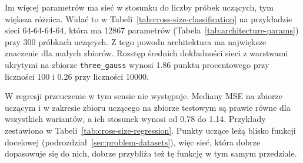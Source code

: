 Im więcej parametrów ma sieć w stosunku do liczby próbek uczących, tym większa różnica. Widać to w Tabeli~\ref{tab:cross-size-classification} na przykładzie sieci 64-64-64-64, która ma \num{12867} parametrów (Tabela~\ref{tab:architecture-params}) przy $300$ próbkach uczących. Z tego powodu architektura ma największe znaczenie dla małych zbiorów. Rozstęp średnich dokładności sieci z warstwami ukrytymi na zbiorze \texttt{three\_gauss} wynosi \num{1.86} punktu procentowego przy liczności \num{100} i \num{0.26} przy liczności \num{10000}.

W regresji przeuczenie w tym sensie nie występuje. Mediany MSE na zbiorze uczącym i w zakresie zbioru uczącego na zbiorze testowym są prawie równe dla wszystkich wariantów, a ich stosunek wynosi od \num{0.78} do \num{1.14}. Przykłady zestawiono w Tabeli~\ref{tab:cross-size-regression}. Punkty uczące leżą blisko funkcji docelowej (podrozdział~\ref{sec:problem-datasets}), więc sieć, która dobrze dopasowuje się do nich, dobrze przybliża też tę funkcję w tym samym przedziale.

